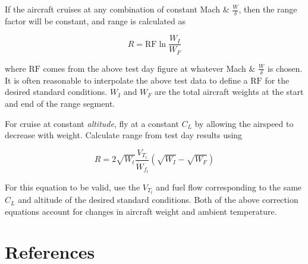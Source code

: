 \documentclass[
]{book}
\begin{document}
If the aircraft cruises at any combination of constant Mach \& \(\frac{W}{\delta}\),
then the range factor will be constant, and range is calculated as

\[
R = \mathrm{RF} \ln \frac{W_I}{W_F}
\label{eq:rng-factor-const-M-w-delta}
\]

where \(\mathrm{RF}\) comes from the above test day figure at whatever Mach \&
\(\frac{W}{\delta}\) is chosen. It is often reasonable to interpolate the above
test data to define a \(\mathrm{RF}\) for the desired standard conditions.
\(W_I\) and \(W_F\) are the total aircraft weights at the start and end of the
range segment.

For cruise at constant \emph{altitude}, fly at a constant \(C_L\) by allowing the
airspeed to decrease with weight. Calculate range from test day results using

\[
R = 2 \sqrt{W_t} \frac{V_{T_t}}{\dot{W}_{f_t}} \left( \sqrt{W_I} - \sqrt{W_F} \right)
\label{eq:rng-const-alt}
\]

For this equation to be valid, use the \(V_{T_t}\) and fuel flow corresponding
to the same \(C_L\) and altitude of the desired standard conditions. Both of the
above correction equations account for changes in aircraft weight and ambient
temperature.

\hypertarget{references}{%
\section{References}\label{references}}
\end{document}
